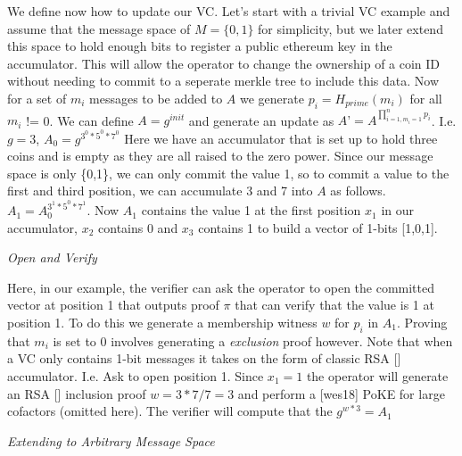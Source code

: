 \documentclass[11pt]{article}
\begin{document}
We define now how to update our VC. Let’s start with a trivial VC example and assume that the message space of $M = \{0,1\}$ for simplicity, but we later extend this space to hold enough bits to register a public ethereum key in the accumulator. This will allow the operator to change the ownership of a coin ID without needing to commit to a seperate merkle tree to include this data. Now for a set of $m_i$ messages to be added to $A$ we generate $p_i = H_{prime}(m_i)$ for all $m_i$ != 0. We can define $A=g^{init}$ and generate an update as $A’ = A^{\prod_{i=1, m_i=1}^{n}p_i}$. I.e. $g=3$, $A_0=g^{3^0*5^0*7^0}$ Here we have an accumulator that is set up to hold three coins and is empty as they are all raised to the zero power. Since our message space is only \{0,1\}, we can only commit the value 1, so to commit a value to the first and third position, we can accumulate 3 and 7 into $A$ as follows.  $A_1 = A_0^{3^1*5^0*7^1}$.  Now $A_1$ contains the value 1 at the first position $x_1$ in our accumulator, $x_2$ contains 0 and $x_3$ contains 1 to build a vector of 1-bits [1,0,1].
\\

\centerline{\textit{Open and Verify}}

Here, in our example, the verifier can ask the operator to open the committed vector at position 1 that outputs proof $\pi$ that can verify that the value is 1 at position 1. To do this we generate a membership witness $w$ for $p_i$ in $A_1$. Proving that $m_i$ is set to 0 involves generating a \textit{exclusion} proof however. Note that when a VC only contains 1-bit messages it takes on the form of classic RSA [] accumulator. I.e. Ask to open position 1. Since $x_1 = 1$ the operator will generate an RSA [] inclusion proof $w= 3*7/7 = 3$ and perform a [wes18] PoKE for large cofactors (omitted here). The verifier will compute that the $g^{w*3} = A_1$ 
\\

\centerline{\textit{Extending to Arbitrary Message Space}}
\end{document}
